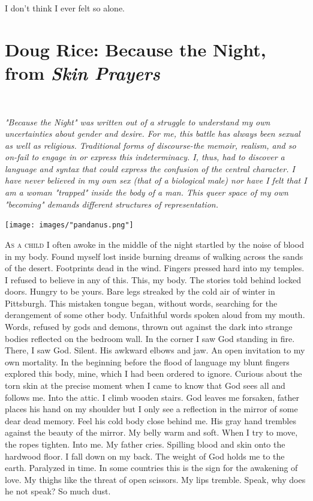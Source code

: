 \documentclass[
]{memoir}
\begin{document}
I don't think I ever felt so alone.

\hypertarget{doug-rice-because-the-night-from-skin-prayers}{%
\chapter{\texorpdfstring{Doug Rice: Because the Night, from \emph{Skin
Prayers}}{Doug Rice: Because the Night, from Skin Prayers}}\label{doug-rice-because-the-night-from-skin-prayers}}

~

\emph{"Because the Night" was written out of a struggle to understand my
own uncertainties about gender and desire. For me, this battle has
always been sexual as well as religious. Traditional forms of
discourse-the memoir, realism, and so on-fail to engage in or express
this indeterminacy. I, thus, had to discover a language and syntax that
could express the confusion of the central character. I have never
believed in my own sex (that of a biological male) nor have I felt that
I am a woman "trapped" inside the body of a man. This queer space of my
own "becoming" demands different structures of representation.}

\begin{center}\texttt{[image: images/"pandanus.png"]}\end{center}

\lettrine[lines=3, findent=0em, nindent=0.1em, lhang=0]{A}{s a child} I
often awoke in the middle of the night startled by the noise of blood in
my body. Found myself lost inside burning dreams of walking across the
sands of the desert. Footprints dead in the wind. Fingers pressed hard
into my temples. I refused to believe in any of this. This, my body. The
stories told behind locked doors. Hungry to be yours. Bare legs streaked
by the cold air of winter in Pittsburgh. This mistaken tongue began,
without words, searching for the derangement of some other body.
Unfaithful words spoken aloud from my mouth. Words, refused by gods and
demons, thrown out against the dark into strange bodies reflected on the
bedroom wall. In the corner I saw God standing in fire. There, I saw
God. Silent. His awkward elbows and jaw. An open invitation to my own
mortality. In the beginning before the flood of language my blunt
fingers explored this body, mine, which I had been ordered to ignore.
Curious about the torn skin at the precise moment when I came to know
that God sees all and follows me. Into the attic. I climb wooden stairs.
God leaves me forsaken, father places his hand on my shoulder but I only
see a reflection in the mirror of some dear dead memory. Feel his cold
body close behind me. His gray hand trembles against the beauty of the
mirror. My belly warm and soft. When I try to move, the ropes tighten.
Into me. My father cries. Spilling blood and skin onto the hardwood
floor. I fall down on my back. The weight of God holds me to the earth.
Paralyzed in time. In some countries this is the sign for the awakening
of love. My thighs like the threat of open scissors. My lips tremble.
Speak, why does he not speak? So much dust.
\end{document}
